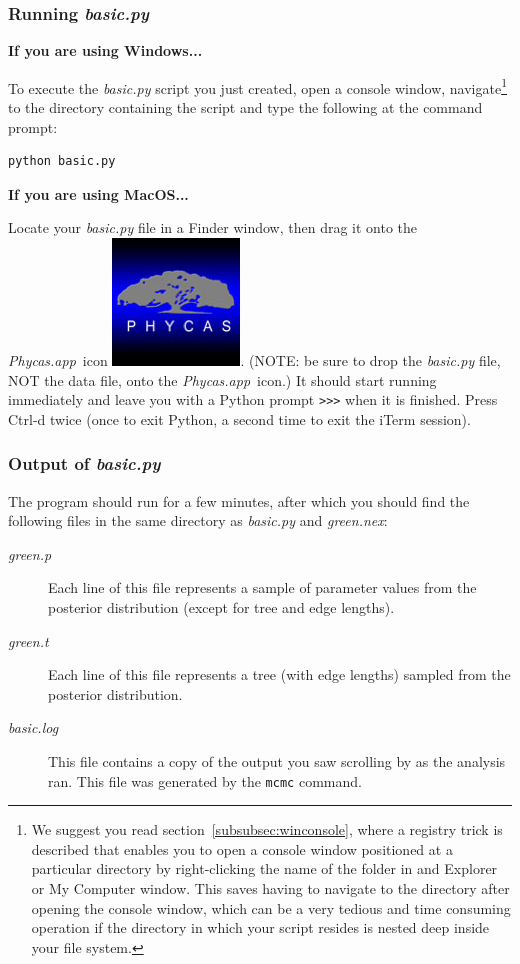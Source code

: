 \documentclass[10pt]{article}
\newcommand{\pathname}[1]{{\em #1}}				%
\newcommand{\keycmd}[1]{{\sf #1}}					%
\newcommand{\code}[1]{{\tt #1}}					%
\newcommand{\cmd}[1]{{\tt \small #1}\index{#1}}	%
\newcommand{\phycasapp}{\pathname{Phycas.app}}
\newcommand{\phycasicon}{\includegraphics[scale=0.2]{images/PhycasGUI}}
\begin{document}
\clearpage

\subsubsection{Running \pathname{basic.py}}
\label{subsubsec:runningbasicpy}

{\bf If you are using Windows...} 

To execute the \pathname{basic.py} script you just created, open a console window, navigate\footnote{We suggest you read section~\ref{subsubsec:winconsole}, where a registry trick is described that enables you to open a console window positioned at a particular directory by right-clicking the name of the folder in and Explorer or My Computer window. This saves having to navigate to the directory after opening the console window, which can be a very tedious and time consuming operation if the directory in which your script resides is nested deep inside your file system.} to the directory containing the script and type the following at the command prompt:
%
\begin{verbatim}
python basic.py
\end{verbatim}

{\bf If you are using MacOS...} 

Locate your \pathname{basic.py} file in a Finder window, then drag it onto the \phycasapp\ icon \phycasicon. (NOTE: be sure to drop the \pathname{basic.py} file, NOT the data file, onto the \phycasapp\ icon.) It should start running immediately and leave you with a Python prompt \code{>>>} when it is finished. Press \keycmd{Ctrl-d} twice (once to exit Python, a second time to exit the iTerm session).

\subsubsection{Output of \pathname{basic.py}}
The program should run for a few minutes, after which you should find the following files in the same directory as \pathname{basic.py} and \pathname{green.nex}:
\begin{description}
\item[\pathname{green.p}] Each line of this file represents a sample of parameter values from the posterior distribution (except for tree and edge lengths). 
\item[\pathname{green.t}] Each line of this file represents a tree (with edge lengths) sampled from the posterior distribution.
\item[\pathname{basic.log}] This file contains a copy of the output you saw scrolling by as the analysis ran. This file was generated by the \cmd{mcmc} command.
\end{description}
\end{document}
